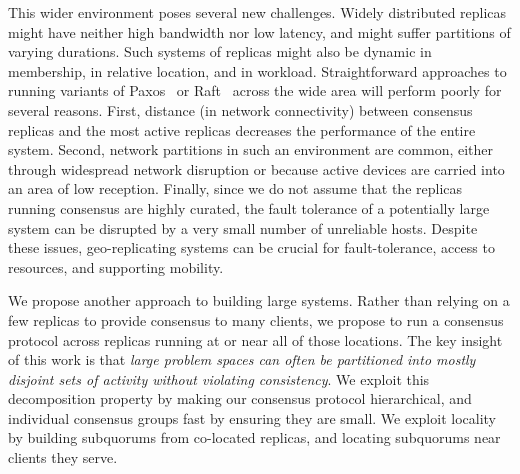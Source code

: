 \documentclass[letterpaper,10pt,twocolumn]{article}
\newcommand{\subs}{subquorums\xspace}
\begin{document}
This wider environment poses several new challenges.
Widely distributed replicas might have neither high bandwidth nor low latency, and might
suffer partitions of varying durations.
Such systems of replicas might also be dynamic in membership, in relative
location, and in workload.
Straightforward approaches to running variants of
Paxos~\cite{lamport_paxos_2001} or Raft~\cite{raft} across the wide area will perform
poorly for several reasons.
First, distance (in network connectivity) between consensus replicas and the
most active replicas decreases the performance of the entire system.
Second, network partitions in such an environment are common, either through
widespread network disruption or because active devices are carried into
an area of low reception.
Finally, since we do not assume that the replicas running consensus are
highly curated, the fault tolerance of a potentially large system can be
disrupted by a very small number of unreliable hosts.
Despite these issues, geo-replicating systems can be crucial for fault-tolerance, access to
resources, and supporting mobility.

We propose another approach to building large systems.
Rather than relying on a few replicas to provide consensus to many clients, we
propose to run a consensus protocol across replicas running at or near all of
those locations.
The key insight of this work is that \emph{large problem spaces can often be partitioned
into mostly disjoint sets of activity without violating consistency}.
We exploit this decomposition property by making our consensus protocol hierarchical, and
individual consensus groups fast by ensuring they are small.
We exploit locality by building \subs from co-located replicas, and locating \subs near
clients they serve.
\end{document}
